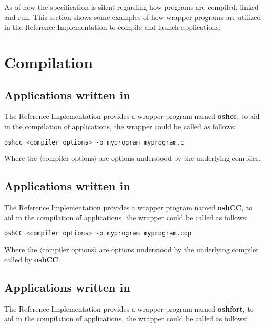 
As of now the \openshmem{} specification is silent regarding how \openshmem{} programs
are compiled, linked and run. This section shows some examples of
how wrapper programs are utilized in the \openshmem{} Reference Implementation to compile and launch applications.
\section{Compilation}
\subsection*{Applications written in \Clang}

The  \openshmem{} Reference Implementation provides a wrapper program named \textbf{oshcc}, to aid in the compilation of \Clang{} applications, the wrapper
could be called as follows:

\begin{lstlisting}[language=bash]
oshcc <compiler options> -o myprogram myprogram.c
\end{lstlisting}
Where the $\langle\mbox{compiler options}\rangle$ are options understood by the underlying \Clang{} compiler.


\subsection*{Applications written in \Cpp}

The  \openshmem{} Reference Implementation provides a wrapper program named \textbf{oshCC}, to aid in the compilation of \Cpp{} applications, the
wrapper could be called as follows:

\begin{lstlisting}[language=bash]
oshCC <compiler options> -o myprogram myprogram.cpp
\end{lstlisting}
Where the $\langle\mbox{compiler options}\rangle$ are options understood by the underlying \Cpp{} compiler called by \textbf{oshCC}.


\subsection*{Applications written in \Fortran}

The  \openshmem{} Reference Implementation provides a wrapper program named \textbf{oshfort}, to aid in the compilation of \Fortran{} applications,
the wrapper could be called as follows:

